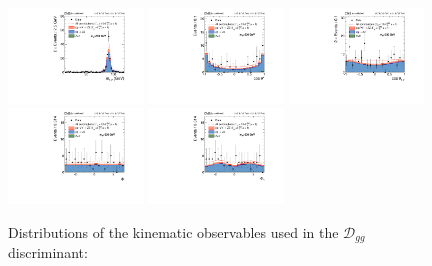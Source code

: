 \begin{figure}
\centering
\includegraphics[width=0.32\textwidth]{HZZ_Width/cCompare_DataMC_AllTeV_avgMZ_330.pdf}
\includegraphics[width=0.32\textwidth]{HZZ_Width/cCompare_DataMC_AllTeV_ZS_330.pdf} 
\includegraphics[width=0.32\textwidth]{HZZ_Width/cCompare_DataMC_AllTeV_h1h2_330.pdf} \\
\includegraphics[width=0.32\textwidth]{HZZ_Width/cCompare_DataMC_AllTeV_helphi_330.pdf}
\includegraphics[width=0.32\textwidth]{HZZ_Width/cCompare_DataMC_AllTeV_phi_330.pdf}
\caption[Distributions of the kinematic observables used in the $\mathcal{D}_{gg}$ discriminant:
$m_{Z_i}$, $\cos\theta^*$, $\cos\theta_{i}$, $\Phi$, and $\Phi_{1}$. The distributions for $m_{Z_{1}}$ and $m_{Z_{2}}$, and $\cos\theta_{1}$ and $\cos\theta_{2}$, are summed together. The observed data (points with error bars), the expectations for the SM background and the SM Higgs boson signal (shaded area), and the Higgs boson with a width $\Gamma_{H} = 10 \times \Gamma_{H}^{\mathrm{SM}}$ (unfilled area) are shown. The mass of the resonance is taken to be $\unit{125.6}{\GeV}$ and the gg enriched off resonance region is shown $\left(m_{4\ell} > \unit{330}{\GeV}\right)$.]{Distributions of the kinematic observables used in the $\mathcal{D}_{gg}$ discriminant:
}
\end{figure}
